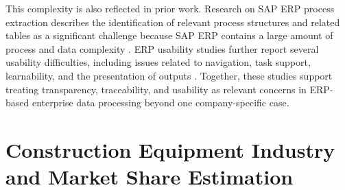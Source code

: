 This complexity is also reflected in prior work. Research on SAP ERP process extraction describes the identification of relevant process structures and related tables as a significant challenge because SAP ERP contains a large amount of process and data complexity \cite{weber2022sap}. ERP usability studies further report several usability difficulties, including issues related to navigation, task support, learnability, and the presentation of outputs \cite{calisir2004erp,wong2016sap}. Together, these studies support treating transparency, traceability, and usability as relevant concerns in ERP-based enterprise data processing beyond one company-specific case.




\section{Construction Equipment Industry and Market Share Estimation}








